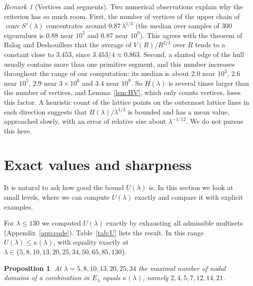 \documentclass[11pt]{amsart}
\newtheorem{proposition}[theorem]{Proposition}
\theoremstyle{definition}
\theoremstyle{remark}
\newtheorem{remark}[theorem]{Remark}
\newcommand{\conv}{\operatorname{conv}}
\numberwithin{equation}{section}
\begin{document}
\begin{remark}[Vertices and segments]\label{rem:segments}
Two numerical observations explain why the criterion has so much room. First, the number of
vertices of the upper chain of $\conv S'(\lambda)$ concentrates around $0.87\,\lambda^{1/3}$
(the median over samples of $300$ eigenvalues is $0.88$ near $10^5$ and $0.87$ near $10^9$).
This agrees with the theorem of Balog and Deshouillers \cite{BalogDeshouillers} that the
average of $V(R)/R^{2/3}$ over $R$ tends to a constant close to $3.453$, since
$3.453/4\approx0.863$. Second, a slanted edge of the hull usually contains more than one
primitive segment, and this number increases throughout the range of our computation: its
median is about $2.0$ near $10^3$, $2.6$ near $10^5$, $2.9$ near $3\times10^6$ and $3.4$ near
$10^9$. So $H(\lambda)$ is several times larger than the number of vertices, and
Lemma~\ref{lem:HV}, which only counts vertices, loses this factor. A heuristic count of the
lattice points on the outermost lattice lines in each direction suggests that
$H(\lambda)/\lambda^{1/3}$ is bounded and has a mean value, approached slowly, with an error of
relative size about $\lambda^{-1/12}$. We do not pursue this here.
\end{remark}

\section{Exact values and sharpness}\label{sec:sharp}

It is natural to ask how good the bound $U(\lambda)$ is. In this section we look at small levels,
where we can compute $U(\lambda)$ exactly and compare it with explicit examples.

For $\lambda\le130$ we computed $U(\lambda)$ exactly by exhausting all admissible multisets
(Appendix~\ref{app:code}). Table~\ref{tab:U} lists the result. In this range
$U(\lambda)\le\kappa(\lambda)$, with equality exactly at
$\lambda\in\{5,8,10,13,20,25,34,50,65,85,130\}$.



\begin{proposition}\label{prop:sharp}
At $\lambda=5,8,10,13,20,25,34$ the maximal number of nodal domains of a combination in
$E_\lambda$ equals $\kappa(\lambda)$, namely $2,4,5,7,12,14,21$.
\end{proposition}
\end{document}
